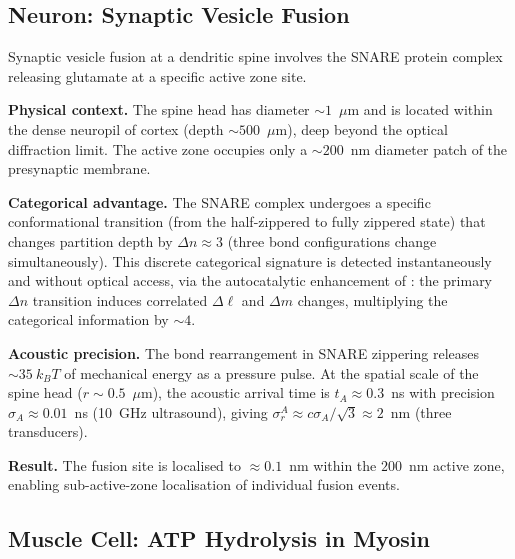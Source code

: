 \subsection{Neuron: Synaptic Vesicle Fusion}

\begin{example}
\label{ex:neuron}
Synaptic vesicle fusion at a dendritic spine involves the SNARE protein
complex releasing glutamate at a specific active zone site.

\textbf{Physical context.}  The spine head has diameter $\sim 1$~$\mu$m
and is located within the dense neuropil of cortex (depth $\sim 500$~$\mu$m),
deep beyond the optical diffraction limit.  The active zone occupies only a
$\sim 200$~nm diameter patch of the presynaptic membrane.

\textbf{Categorical advantage.}  The SNARE complex undergoes a specific
conformational transition (from the half-zippered to fully zippered state)
that changes partition depth by $\Delta n \approx 3$ (three bond configurations
change simultaneously).  This discrete categorical signature is detected
instantaneously and without optical access, via the autocatalytic enhancement
of : the primary $\Delta n$ transition induces
correlated $\Delta\ell$ and $\Delta m$ changes, multiplying the categorical
information by $\sim 4$.

\textbf{Acoustic precision.}  The bond rearrangement in SNARE zippering
releases $\sim 35~k_BT$ of mechanical energy as a pressure pulse.  At the
spatial scale of the spine head ($r \sim 0.5$~$\mu$m), the acoustic arrival
time is $t_A \approx 0.3$~ns with precision $\sigma_A \approx 0.01$~ns
(10~GHz ultrasound), giving $\sigma_r^A \approx c\sigma_A/\sqrt{3}
\approx 2$~nm (three transducers).

\textbf{Result.}  The fusion site is localised to $\approx 0.1$~nm within
the $200$~nm active zone, enabling sub-active-zone localisation of individual
fusion events.
\end{example}

\subsection{Muscle Cell: ATP Hydrolysis in Myosin}

